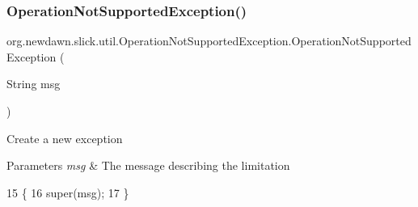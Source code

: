 \subsubsection{\texorpdfstring{Operation\+Not\+Supported\+Exception()}{OperationNotSupportedException()}}
{\footnotesize\ttfamily org.\+newdawn.\+slick.\+util.\+Operation\+Not\+Supported\+Exception.\+Operation\+Not\+Supported\+Exception (\begin{DoxyParamCaption}\item[{String}]{msg }\end{DoxyParamCaption})\hspace{0.3cm}{\ttfamily [inline]}}

Create a new exception


\begin{DoxyParams}{Parameters}
{\em msg} & The message describing the limitation \\
\hline
\end{DoxyParams}

\begin{DoxyCode}
15                                                       \{
16         super(msg);
17     \}
\end{DoxyCode}
